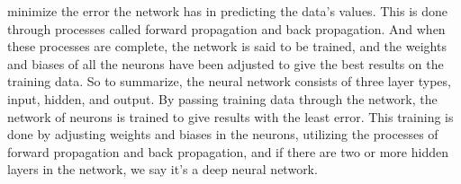minimize the error the network has in predicting the data's values.
This is done through processes called forward propagation and back propagation.
And when these processes are complete, the network is said to be trained, and
the weights and biases of all the neurons have been adjusted to give the best
results on the training data. So to summarize, the neural network consists of
three layer types, input, hidden, and output. 
By passing training data through the network, the network of neurons is 
trained to give results with the least error.
This training is done by adjusting weights and biases in the neurons, utilizing
the processes of forward propagation and back propagation, and if there are two
or more hidden layers in the network, we say it's a deep neural network.
